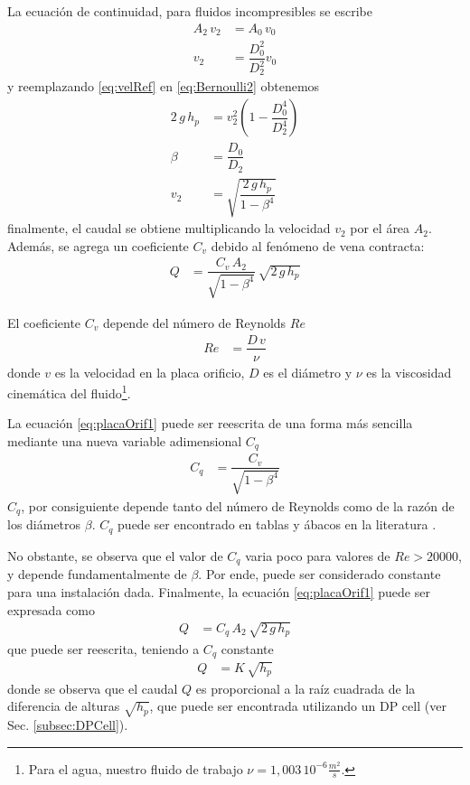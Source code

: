 La ecuación de continuidad, para fluidos incompresibles se escribe
\begin{align}
 A_2\,v_2 &= A_0\,v_0 \\
 v_2 &= \dfrac{D_0^2}{D_2^2} v_0
 \label{eq:velRef}
\end{align}
y reemplazando \eqref{eq:velRef} en \eqref{eq:Bernoulli2} obtenemos
\begin{align}
 2 \, g \, h_p &= v_2^2 \left( 1 - \dfrac{D_0^4}{D_2^4} \right)\\
 \beta &= \dfrac{D_0}{D_2}\\
 v_2 &= \sqrt{\dfrac{2 \, g \, h_p}{1-\beta^4}}
\end{align}
finalmente, el caudal se obtiene multiplicando la velocidad $v_2$ por el
área $A_2$.
Además, se agrega un coeficiente $C_v$ debido al fenómeno de vena contracta:
\begin{align}
 Q &= \dfrac{C_v \, A_2}{\sqrt{1-\beta^4}}\, \sqrt{2 \, g \, h_p}
 \label{eq:placaOrif1}
\end{align}

El coeficiente $C_v$ depende del número de Reynolds $Re$
\cite{bib:Mataix, bib:ApuntesPuglesiPlacaOrif}
\begin{align}
Re &= \dfrac{D\,v}{\nu}
\end{align}
donde $v$ es la velocidad en la placa orificio, $D$ es el diámetro y ${\nu}$
es la viscosidad cinemática del fluido\footnote{Para el agua, nuestro fluido de
trabajo $\nu = 1,003\,10^{-6} \frac{m^2}{s}$.}.

La ecuación \eqref{eq:placaOrif1} puede ser reescrita de una forma más sencilla
mediante una nueva variable adimensional $C_q$
\begin{align}
 C_q &= \dfrac{C_v}{\sqrt{1-\beta^4}}
\end{align}
$C_q$, por consiguiente depende tanto del número de Reynolds como de la razón
de los diámetros $\beta$. $C_q$ puede ser encontrado en tablas y ábacos en la
literatura \cite{bib:Mataix}.

No obstante, se observa que el valor de $C_q$ varia poco para valores de
$Re > 20000$, y depende fundamentalmente de $\beta$.
Por ende, puede ser considerado constante para una instalación dada.
Finalmente, la ecuación \eqref{eq:placaOrif1} puede ser expresada como
\begin{align}
 Q &= C_q\,A_2\, \sqrt{2\,g\,h_p}
\end{align}
que puede ser reescrita, teniendo a $C_q$ constante
\begin{align}
 Q &= K\,\sqrt{h_p}
 \label{eq:placaOrifPLC}
\end{align}
donde se observa que el caudal $Q$ es proporcional a la raíz cuadrada de
la diferencia de alturas $\sqrt{h_p}$, que puede
ser encontrada utilizando un DP cell (ver Sec. \ref{subsec:DPCell}).


